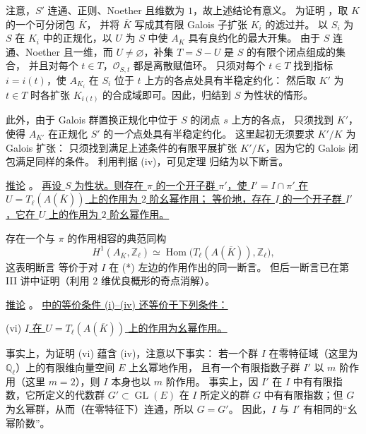 注意，$S'$ 连通、正则、Noether 且维数为 $1$，故上述结论有意义。
为证明 ，取 $K$ 的一个可分闭包 $\overline K$，
并将 $\overline K$ 写成其有限 Galois 子扩张 $K_i$ 的滤过并。
以 $S_i$ 为 $S$ 在 $K_i$ 中的正规化，以 $U$ 为 $S$ 中使 $A_K$ 具有良约化的最大开集。
由于 $S$ 连通、Noether 且一维，而 $U\ne\varnothing$，补集 $T=S-U$ 是 $S$ 的有限个闭点组成的集合，
并且对每个 $t\in T$，$\mathcal O_{S,t}$ 都是离散赋值环。
只须对每个 $t\in T$ 找到指标 $i=i(t)$，使 $A_{K_i}$ 在 $S_i$ 位于 $t$ 上方的各点处具有半稳定约化：
然后取 $K'$ 为 $t\in T$ 时各扩张 $K_{i(t)}$ 的合成域即可。因此，归结到 $S$ 为性状的情形。

此外，由于 Galois 群置换正规化中位于 $S$ 的闭点 $s$ 上方的各点，
只须找到 $K'$，使得 $A_{K'}$ 在正规化 $S'$ 的\emph{一个}点处具有半稳定约化。
这里起初无须要求 $K'/K$ 为 Galois 扩张：
只须找到满足上述条件的有限平展扩张 $K'/K$，因为它的 Galois 闭包满足同样的条件。
利用判据 (iv)，可见定理  归结为以下断言。

\medskip
\noindent
\underline{推论} 。
\underline{再设 $S$ 为性状。则存在 $\pi$ 的一个开子群 $\pi'$，使 $I'=I\cap\pi'$
在 $U=T_\ell(A(\overline K))$ 上的作用为 $2$ 阶幺幂作用；
等价地，存在 $I$ 的一个开子群 $I'$，它在 $U$ 上的作用为 $2$ 阶幺幂作用。}

存在一个与 $\pi$ 的作用相容的典范同构
\begin{equation}\tag{*}
 H^1(A_{\overline K},\mathbb Z_\ell)
 \simeq
 \operatorname{Hom}\bigl(T_\ell(A(\overline K)),\mathbb Z_\ell\bigr),
\end{equation}
这表明断言  等价于对 $I$ 在 (*) 左边的作用作出的同一断言。
但后一断言已在第 III 讲中证明（利用 $2$ 维优良概形的奇点消解）。

\medskip
\noindent
\underline{推论} 。
\underline{ 中的等价条件 (i)--(iv) 还等价于下列条件：}

\smallskip
\noindent
(vi) \quad \underline{$I$ 在 $U=T_\ell(A(\overline K))$ 上的作用为幺幂作用。}

事实上，为证明 (vi) 蕴含 (iv)，注意以下事实：
若一个群 $I$ 在零特征域（这里为 $\mathbb Q_\ell$）上的有限维向量空间 $E$ 上幺幂地作用，
且有一个有限指数子群 $I'$ 以 $m$ 阶作用（这里 $m=2$），则 $I$ 本身也以 $m$ 阶作用。
事实上，因 $I'$ 在 $I$ 中有有限指数，它所定义的代数群 $G'\subset\operatorname{GL}(E)$
在 $I$ 所定义的群 $G$ 中有有限指数；但 $G$ 为幺幂群，从而（在零特征下）连通，所以 $G=G'$。
因此，$I$ 与 $I'$ 有相同的“幺幂阶数”。

